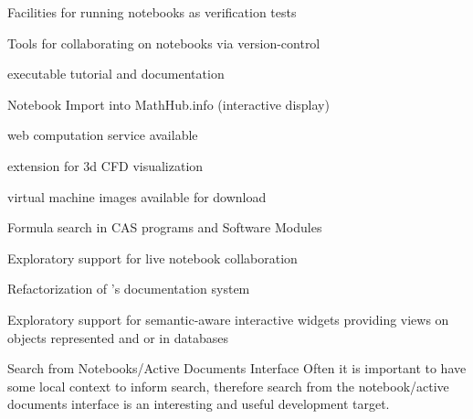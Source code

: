 \begin{workpackage}
\begin{wpdelivs}
  \begin{wpdeliv}[due=18,id=jupyter-test,dissem=PU,nature=OTHER,lead=SR]
      {Facilities for running notebooks as verification tests}
  \end{wpdeliv}

  \begin{wpdeliv}[due=12,id=jupyter-collab,dissem=PU,nature=OTHER,lead=SR]
      {Tools for collaborating on notebooks via version-control}
  \end{wpdeliv}
    \begin{wpdeliv}[due=21,id=oommf-nb-documentation,dissem=PU,nature=DEC,lead=USO]
      {\OOMMFNB{} executable tutorial and documentation}
    \end{wpdeliv}
    \begin{wpdeliv}[id=jupyter-import,due=24,nature=DEM,dissem=PU,lead=JU]
      {Notebook Import into MathHub.info (interactive display)}
    \end{wpdeliv}
    \begin{wpdeliv}[due=24,id=oommf-nb-tmp,dissem=PU,nature=DEC,lead=USO]
      {\OOMMFNB{} web computation service available}
    \end{wpdeliv}
  \begin{wpdeliv}[due=24,id=cfd-vis,dissem=PU,nature=OTHER]
      {\Jupyter extension for 3d CFD visualization}
  \end{wpdeliv}
    \begin{wpdeliv}[due=24,id=oommf-nb-virtual,dissem=PU,nature=OTHER, lead=USO]
      {\OOMMFNB{} virtual machine images available for download}
    \end{wpdeliv}
    \begin{wpdeliv}[id=cassearch,due=30,nature=OTHER,dissem=PU,lead=JU]
      {Formula search in CAS programs and Software Modules}
    \end{wpdeliv}
  \begin{wpdeliv}[due=36,id=jupyter-live-collab,dissem=PU,nature=OTHER,lead=SR]
      {Exploratory support for live notebook collaboration}
  \end{wpdeliv}
  \begin{wpdeliv}[due=24,id=sage-sphinx,dissem=PU,nature=OTHER]
      {Refactorization of \Sage's \Sphinx documentation system}
  \end{wpdeliv}
  \begin{wpdeliv}[due=36,id=ipython-advanced-interacts,dissem=PU,nature=DEM]
      {Exploratory support for semantic-aware interactive widgets providing views on objects
      represented and or in databases}
  \end{wpdeliv}
\begin{wpdeliv}[id=nbad-search,due=42,nature=OTHER,dissem=PU,lead=JU]
  {Search from Notebooks/Active Documents Interface} Often it is important to have some
  local context to inform search, therefore search from the notebook/active documents
  interface is an interesting and useful development target.
\end{wpdeliv}


\end{wpdelivs}
\end{workpackage}
